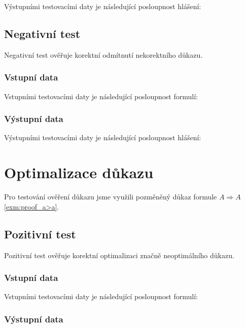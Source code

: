 \documentclass[thesis=B,czech,hidelinks]{thesis}[2012/06/26]
\begin{document}
Výstupními testovacími daty je následující posloupnost hlášení:



\subsection{Negativní test}

Negativní test ověřuje korektní odmítnutí nekorektního důkazu.

\subsubsection{Vstupní data}

Vstupními testovacími daty je následující posloupnost formulí:



\subsubsection{Výstupní data}

Výstupními testovacími daty je následující posloupnost hlášení:



\section{Optimalizace důkazu}

Pro testování ověření důkazu jsme využili pozměněný důkaz formule $A \Rightarrow A$ \ref{exm:proof_a>a}.

\subsection{Pozitivní test}

Pozitivní test ověřuje korektní optimalizaci značně neoptimálního důkazu.

\subsubsection{Vstupní data}

Vstupními testovacími daty je následující posloupnost formulí:



\subsubsection{Výstupní data}
\end{document}
